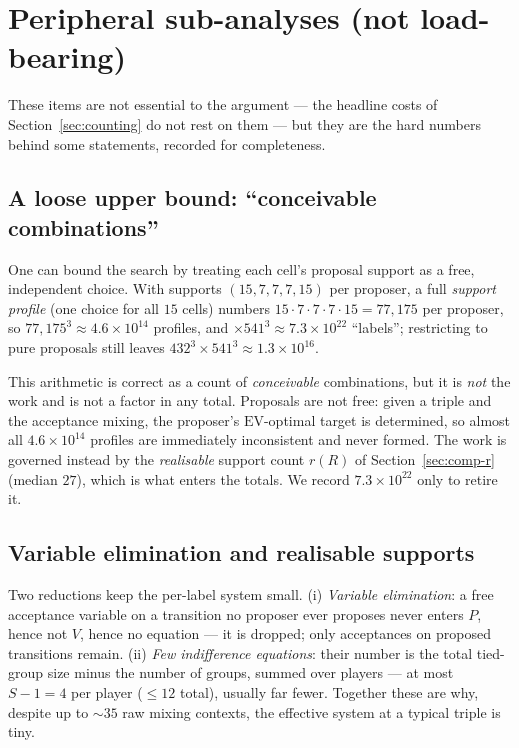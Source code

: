 \documentclass[11pt]{article}
\begin{document}
\appendix
\section{Peripheral sub-analyses (not load-bearing)}
\label{app:peripheral}
These items are not essential to the argument --- the headline costs of
Section~\ref{sec:counting} do not rest on them --- but they are the hard numbers
behind some statements, recorded for completeness.

\subsection{A loose upper bound: ``conceivable combinations''}
\label{app:upperbound}
One can bound the search by treating each cell's proposal support as a free,
independent choice. With supports $(15,7,7,7,15)$ per proposer, a full \emph{support
profile} (one choice for all $15$ cells) numbers $15\cdot7\cdot7\cdot7\cdot15=77{,}175$
per proposer, so $77{,}175^3\approx4.6\times10^{14}$ profiles, and
$\times541^3\approx7.3\times10^{22}$ ``labels''; restricting to pure proposals still
leaves $432^3\times541^3\approx1.3\times10^{16}$.

This arithmetic is correct as a count of \emph{conceivable} combinations, but it is
\emph{not} the work and is not a factor in any total. Proposals are not free: given a
triple and the acceptance mixing, the proposer's $\mathrm{EV}$-optimal target is
determined, so almost all $4.6\times10^{14}$ profiles are immediately inconsistent and
never formed. The work is governed instead by the \emph{realisable} support count
$r(R)$ of Section~\ref{sec:comp-r} (median $27$), which is what enters the totals. We
record $7.3\times10^{22}$ only to retire it.

\subsection{Variable elimination and realisable supports}
\label{app:elimination}
Two reductions keep the per-label system small. (i) \emph{Variable elimination}: a
free acceptance variable on a transition no proposer ever proposes never enters $P$,
hence not $V$, hence no equation --- it is dropped; only acceptances on proposed
transitions remain. (ii) \emph{Few indifference equations}: their number is the total
tied-group size minus the number of groups, summed over players --- at most $S-1=4$
per player ($\leq12$ total), usually far fewer. Together these are why, despite up to
$\sim35$ raw mixing contexts, the effective system at a typical triple is tiny.
\end{document}
